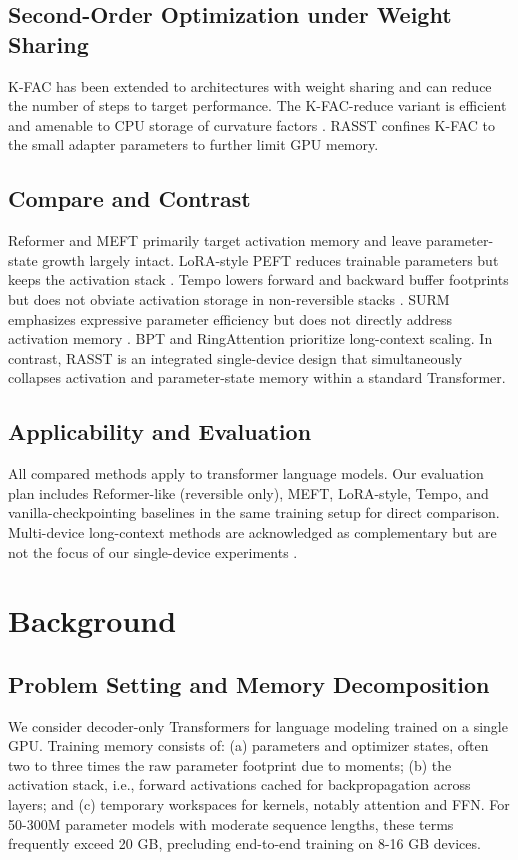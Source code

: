 \documentclass{article}
\begin{document}
\subsection{Second-Order Optimization under Weight Sharing}
K-FAC has been extended to architectures with weight sharing and can reduce the number of steps to target performance. The K-FAC-reduce variant is efficient and amenable to CPU storage of curvature factors \cite{eschenhagen-2023-kronecker}. RASST confines K-FAC to the small adapter parameters to further limit GPU memory.

\subsection{Compare and Contrast}
Reformer and MEFT primarily target activation memory and leave parameter-state growth largely intact. LoRA-style PEFT reduces trainable parameters but keeps the activation stack \cite{he-2021-towards}. Tempo lowers forward and backward buffer footprints but does not obviate activation storage in non-reversible stacks \cite{andoorveedu-2022-tempo}. SURM emphasizes expressive parameter efficiency but does not directly address activation memory \cite{sehanobish-2024-structured}. BPT and RingAttention prioritize long-context scaling. In contrast, RASST is an integrated single-device design that simultaneously collapses activation and parameter-state memory within a standard Transformer.

\subsection{Applicability and Evaluation}
All compared methods apply to transformer language models. Our evaluation plan includes Reformer-like (reversible only), MEFT, LoRA-style, Tempo, and vanilla-checkpointing baselines in the same training setup for direct comparison. Multi-device long-context methods are acknowledged as complementary but are not the focus of our single-device experiments \cite{liu-2023-ringattention}.

\section{Background}
\subsection{Problem Setting and Memory Decomposition}
We consider decoder-only Transformers for language modeling trained on a single GPU. Training memory consists of: (a) parameters and optimizer states, often two to three times the raw parameter footprint due to moments; (b) the activation stack, i.e., forward activations cached for backpropagation across layers; and (c) temporary workspaces for kernels, notably attention and FFN. For 50-300M parameter models with moderate sequence lengths, these terms frequently exceed 20 GB, precluding end-to-end training on 8-16 GB devices.
\end{document}
